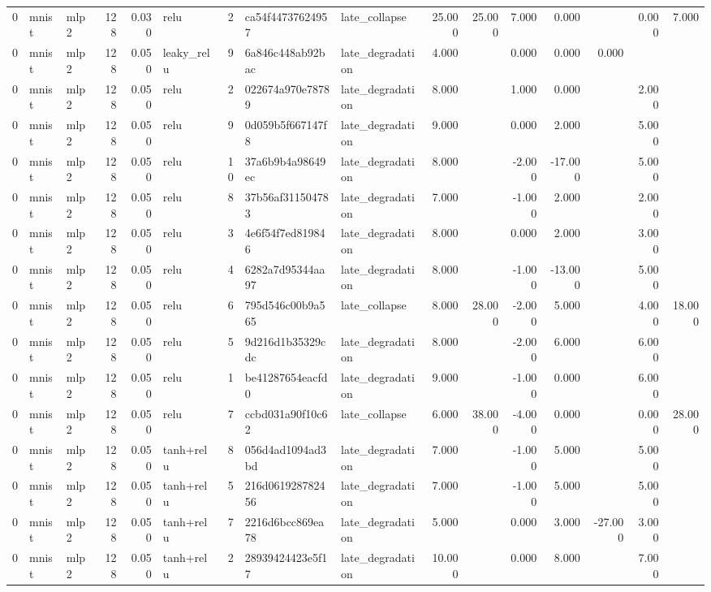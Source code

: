 \begin{table}[htbp]
{\begin{tabular}{@{}rllrrlrllrrrrrrr@{}}
0 & mnist & mlp2 & 128 & 0.030 & relu & 2 & ca54f44737624957 & late\_collapse & 25.000 & 25.000 & 7.000 & 0.000 &  & 0.000 & 7.000 \\
0 & mnist & mlp2 & 128 & 0.050 & leaky\_relu & 9 & 6a846c448ab92bac & late\_degradation & 4.000 &  & 0.000 & 0.000 & 0.000 &  &  \\
0 & mnist & mlp2 & 128 & 0.050 & relu & 2 & 022674a970e78789 & late\_degradation & 8.000 &  & 1.000 & 0.000 &  & 2.000 &  \\
0 & mnist & mlp2 & 128 & 0.050 & relu & 9 & 0d059b5f667147f8 & late\_degradation & 9.000 &  & 0.000 & 2.000 &  & 5.000 &  \\
0 & mnist & mlp2 & 128 & 0.050 & relu & 10 & 37a6b9b4a98649ec & late\_degradation & 8.000 &  & -2.000 & -17.000 &  & 5.000 &  \\
0 & mnist & mlp2 & 128 & 0.050 & relu & 8 & 37b56af311504783 & late\_degradation & 7.000 &  & -1.000 & 2.000 &  & 2.000 &  \\
0 & mnist & mlp2 & 128 & 0.050 & relu & 3 & 4e6f54f7ed819846 & late\_degradation & 8.000 &  & 0.000 & 2.000 &  & 3.000 &  \\
0 & mnist & mlp2 & 128 & 0.050 & relu & 4 & 6282a7d95344aa97 & late\_degradation & 8.000 &  & -1.000 & -13.000 &  & 5.000 &  \\
0 & mnist & mlp2 & 128 & 0.050 & relu & 6 & 795d546c00b9a565 & late\_collapse & 8.000 & 28.000 & -2.000 & 5.000 &  & 4.000 & 18.000 \\
0 & mnist & mlp2 & 128 & 0.050 & relu & 5 & 9d216d1b35329cdc & late\_degradation & 8.000 &  & -2.000 & 6.000 &  & 6.000 &  \\
0 & mnist & mlp2 & 128 & 0.050 & relu & 1 & be41287654eacfd0 & late\_degradation & 9.000 &  & -1.000 & 0.000 &  & 6.000 &  \\
0 & mnist & mlp2 & 128 & 0.050 & relu & 7 & ccbd031a90f10c62 & late\_collapse & 6.000 & 38.000 & -4.000 & 0.000 &  & 0.000 & 28.000 \\
0 & mnist & mlp2 & 128 & 0.050 & tanh+relu & 8 & 056d4ad1094ad3bd & late\_degradation & 7.000 &  & -1.000 & 5.000 &  & 5.000 &  \\
0 & mnist & mlp2 & 128 & 0.050 & tanh+relu & 5 & 216d061928782456 & late\_degradation & 7.000 &  & -1.000 & 5.000 &  & 5.000 &  \\
0 & mnist & mlp2 & 128 & 0.050 & tanh+relu & 7 & 2216d6bcc869ea78 & late\_degradation & 5.000 &  & 0.000 & 3.000 & -27.000 & 3.000 &  \\
0 & mnist & mlp2 & 128 & 0.050 & tanh+relu & 2 & 28939424423e5f17 & late\_degradation & 10.000 &  & 0.000 & 8.000 &  & 7.000 &  \\

\end{tabular}}
\end{table}

